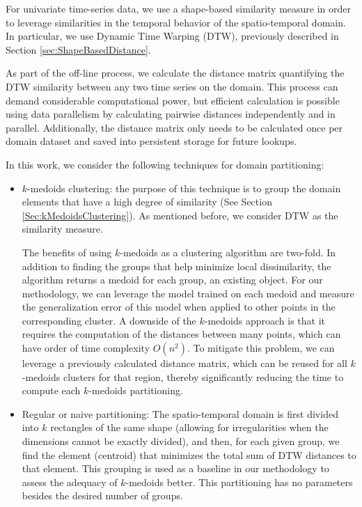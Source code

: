 For univariate time-series data, we use a shape-based similarity measure in order to leverage similarities in the temporal behavior of the spatio-temporal domain. In particular, we use Dynamic Time Warping (DTW), previously described in Section \ref{sec:ShapeBasedDistance}.

As part of the off-line process, we calculate the distance matrix quantifying the DTW similarity between any two time series on the domain. This process can demand considerable computational power, but efficient calculation is possible using data parallelism by calculating pairwise distances independently and in parallel. Additionally, the distance matrix only needs to be calculated once per domain dataset and saved into persistent storage for future lookups.

In this work, we consider the following techniques for domain partitioning:

\begin{itemize}%
	\item $k$-medoids clustering: the purpose of this technique is to group the domain elements that have a high degree of similarity (See Section \ref{Sec:kMedoidsClustering}). As mentioned before, we consider DTW as the similarity measure. 
	
	The benefits of using $k$-medoids as a clustering algorithm are two-fold. In addition to finding the groups that help minimize local dissimilarity, the algorithm returns a medoid for each group, an existing object. For our methodology, we can leverage the model trained on each medoid and measure the generalization error of this model when applied to other points in the corresponding cluster. A downside of the $k$-medoids approach is that it requires the computation of the distances between many points, which can have order of time complexity $O(n^2)$. To mitigate this problem, we can leverage a previously calculated distance matrix, which can be reused for all $k$-medoids clusters for that region, thereby significantly reducing the time to compute each $k$-medoids partitioning.
	
	\item Regular or naive partitioning: The spatio-temporal domain is first divided into $k$ rectangles of the same shape (allowing for irregularities when the dimensions cannot be exactly divided), and then, for each given group, we find the element (centroid) that minimizes the total sum of DTW distances to that element. This grouping is used as a baseline in our methodology to assess the adequacy of $k$-medoids better. This partitioning has no parameters besides the desired number of groups.
\end{itemize}

